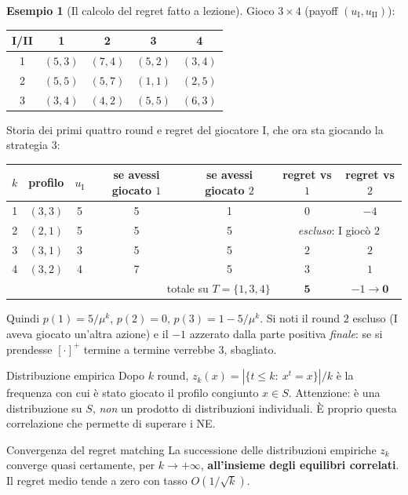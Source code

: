 \documentclass[12pt,a4paper,twoside]{book}
\theoremstyle{plain}
\theoremstyle{definition}
\newtheorem{example}[theorem]{Esempio}
\begin{document}
\begin{example}[Il calcolo del regret fatto a lezione]
Gioco $3\times 4$ (payoff $(u_{\mathrm I},u_{\mathrm{II}})$):
\begin{center}
\begin{tabular}{c|cccc}
I/II & 1 & 2 & 3 & 4\\\hline
1 & $(5,3)$ & $(7,4)$ & $(5,2)$ & $(3,4)$\\
2 & $(5,5)$ & $(5,7)$ & $(1,1)$ & $(2,5)$\\
3 & $(3,4)$ & $(4,2)$ & $(5,5)$ & $(6,3)$
\end{tabular}
\end{center}
Storia dei primi quattro round e regret del giocatore I, che ora sta giocando la
strategia $3$:
\begin{center}
\begin{tabular}{c|cc|cc|cc}
$k$ & profilo & $u_{\mathrm I}$ & se avessi giocato $1$ & se avessi giocato $2$ & regret vs $1$ & regret vs $2$\\\hline
1 & $(3,3)$ & 5 & 5 & 1 & $0$ & $-4$\\
2 & $(2,1)$ & 5 & 5 & 5 & \multicolumn{2}{c}{\emph{escluso}: I giocò $2$}\\
3 & $(3,1)$ & 3 & 5 & 5 & $2$ & $2$\\
4 & $(3,2)$ & 4 & 7 & 5 & $3$ & $1$\\\hline
\multicolumn{5}{r|}{totale su $T=\{1,3,4\}$} & $\mathbf{5}$ & $-1\to \mathbf{0}$
\end{tabular}
\end{center}
Quindi $p(1)=5/\mu^k$, $p(2)=0$, $p(3)=1-5/\mu^k$. Si noti il round $2$ escluso
(I aveva giocato un'altra azione) e il $-1$ azzerato dalla parte positiva
\emph{finale}: se si prendesse $[\cdot]^+$ termine a termine verrebbe $3$, sbagliato.
\end{example}

\begin{defbox}{Distribuzione empirica}
Dopo $k$ round, $z_k(x)=|\{t\le k:\ x^t=x\}|/k$ è la frequenza con cui è stato
giocato il profilo congiunto $x\in S$. Attenzione: è una distribuzione su $S$,
\emph{non} un prodotto di distribuzioni individuali. È proprio questa correlazione
che permette di superare i NE.
\end{defbox}

\begin{thmbox}{Convergenza del regret matching}
La successione delle distribuzioni empiriche $z_k$ converge quasi certamente,
per $k\to+\infty$, \textbf{all'insieme degli equilibri correlati}. Il regret medio
tende a zero con tasso $O(1/\sqrt{k})$.
\end{thmbox}
\end{document}
